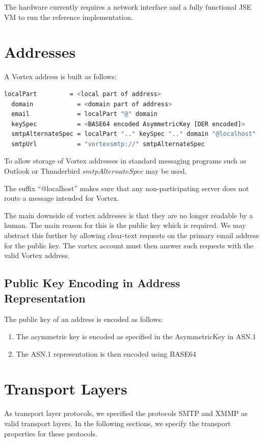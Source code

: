The hardware currently requires a network interface and a fully functional JSE VM to run the reference implementation.

\section{Addresses}

A Vortex address is built as follows: 

\begin{lstlisting}[language=bash]
  localPart         = <local part of address>
  domain            = <domain part of address>
  email             = localPart "@" domain
  keySpec           = <BASE64 encoded AsymmetricKey [DER encoded]>
  smtpAlternateSpec = localPart ".." keySpec ".." domain "@localhost"
  smtpUrl           = "vortexsmtp://" smtpAlternateSpec
\end{lstlisting}

To allow storage of Vortex addresses in standard messaging programs such as Outlook or Thunderbird $smtpAlternateSpec$ may be used. 

The suffix ``@localhost'' makes sure that any non-participating server does not route a message intended for Vortex.

The main downside of vortex addresses is that they are no longer readable by a human. The main reason for this is the public key which is required. We may abstract this further by allowing clear-text requests on the primary email address for the public key. The vortex account must then answer such requests with the valid Vortex address.

\subsection{Public Key Encoding in Address Representation}
The public key of an address is encoded as follows:
\begin{enumerate}
	\item The asymmetric key is encoded as specified in the AsymmetricKey in ASN.1
	\item The ASN.1 representation is then encoded using BASE64
\end{enumerate}    

\section{Transport Layers}                                          
As transport layer protocols, we specified the protocols SMTP and XMMP as valid transport layers. In the following sections, we specify the transport properties for these protocols.

